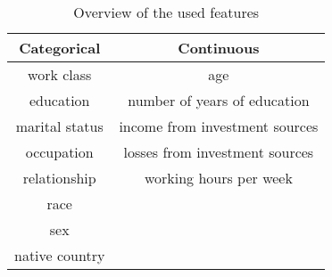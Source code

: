\begin{table}[h]
  \centering
  \begin{tabular}{cc}
    \toprule
  Categorical  & Continuous                     \\
    \midrule
    work class & age                            \\
    education  & number of years of education   \\
marital status & income from investment sources \\
occupation     & losses from investment sources \\
relationship   & working hours per week         \\
race           &                                \\
sex            &                                \\
native country &                                \\
      \bottomrule
  \end{tabular}
  \caption{Overview of the used features}
  \label{tab:features}

\end{table}